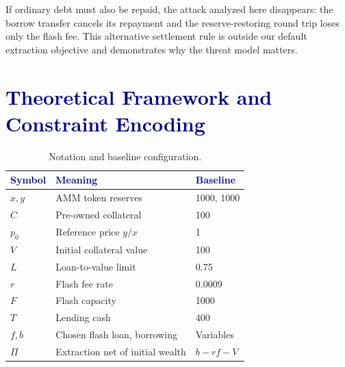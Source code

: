 \documentclass[conference]{IEEEtran}
\begin{document}
If ordinary debt must also be repaid, the attack analyzed here disappears:
the borrow transfer cancels its repayment and the reserve-restoring round trip
loses only the flash fee. This alternative settlement rule is outside our
default extraction objective and demonstrates why the threat model matters.

\section{\textcolor{Navy}{Theoretical Framework and Constraint Encoding}}
\begin{table}[t]
\centering\caption{Notation and baseline configuration.}
\begin{tabular}{lll}\toprule
\textcolor{Navy}{Symbol} & \textcolor{Navy}{Meaning} & \textcolor{Navy}{Baseline}\\\midrule
$x,y$ & AMM token reserves & 1000, 1000\\
$C$ & Pre-owned collateral & 100\\
$p_0$ & Reference price $y/x$ & 1\\
$V$ & Initial collateral value & 100\\
$L$ & Loan-to-value limit & 0.75\\
$r$ & Flash fee rate & 0.0009\\
$F$ & Flash capacity & 1000\\
$T$ & Lending cash & 400\\
$f,b$ & Chosen flash loan, borrowing & Variables\\
$\Pi$ & Extraction net of initial wealth & $b-rf-V$\\
\bottomrule\end{tabular}\end{table}
\end{document}
